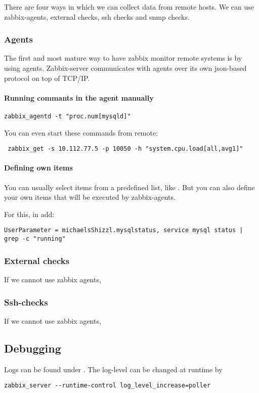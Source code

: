 There are four ways in which we can collect data from remote hosts. We can use zabbix-agents, external checks, ssh checks and snmp checks.

\subsubsection{Agents}
The first and most mature way to have zabbix monitor remote systems is by using agents. Zabbix-server communicates with agents over its own json-based protocol on top of TCP/IP.

\paragraph{Running commants in the agent manually}
\begin{lstlisting}
zabbix_agentd -t "proc.num[mysqld]"
\end{lstlisting}
 You can even start these commands from remote: 
 \begin{lstlisting}
 zabbix_get -s 10.112.77.5 -p 10050 -h "system.cpu.load[all,avg1]"
 \end{lstlisting}

\paragraph{Defining own items}
You can usually select items from a predefined list, like .
But you can also define your own items that will be executed by zabbix-agents.

For this, in  add: 

\begin{lstlisting}
UserParameter = michaelsShizzl.mysqlstatus, service mysql status | grep -c "running"
\end{lstlisting}


\subsubsection{External checks}
If we cannot use zabbix agents, 

\subsubsection{Ssh-checks}
If we cannot use zabbix agents, 



\subsection{Debugging}
Logs can be found under . The log-level can be changed at runtime by 
\begin{lstlisting}
zabbix_server --runtime-control log_level_increase=poller
\end{lstlisting}



